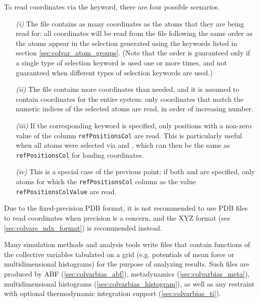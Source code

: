 {To read coordinates via the  keyword, there are four possible scenarios.
\begin{enumerate}
\item[\emph{(i)}] The file contains as many coordinates as the atoms that they are being read for: all coordinates will be read from the file following the same order as the atoms appear in the selection generated using the keywords listed in section \ref{sec:colvar_atom_groups}.
  (Note that the order is guaranteed only if a single type of selection keyword is used one or more times, and not guaranteed when different types of selection keywords are used.)
\item[\emph{(ii)}] The file contains more coordinates than needed, and it is assumed to contain coordinates for the entire system: only coordinates that match the numeric indices of the selected atoms are read, in order of increasing number.
\item[\emph{(iii)}] If the corresponding  keyword is specified, only positions with a non-zero value of the column \texttt{refPositionsCol} are read.
  This is particularly useful when all atoms were selected via  and , which can then be the same as \texttt{refPositionsCol} for loading coordinates.
\item[\emph{(iv)}] This is a special case of the previous point: if both  and  are specified, only atoms for which the \texttt{refPositionsCol} column as the value \texttt{refPositionsColValue} are read.
\end{enumerate}

Due to the fixed-precision PDB format, it is not recommended to use PDB files to read coordinates when precision is a concern, and the XYZ format (see \ref{sec:colvars_ndx_format}) is recommended instead.

} %



Many simulation methods and analysis tools write files that contain functions of the collective variables tabulated on a grid (e.g.{} potentials of mean force or multidimensional histograms) for the purpose of analyzing results.
Such files are produced by ABF (\ref{sec:colvarbias_abf}), metadynamics (\ref{sec:colvarbias_meta}), multidimensional histograms (\ref{sec:colvarbias_histogram}), as well as any restraint with optional thermodynamic integration support (\ref{sec:colvarbias_ti}).

